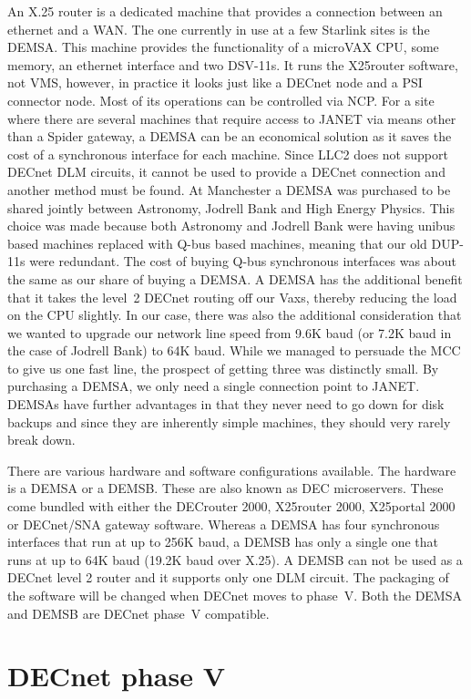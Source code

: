 An X.25 router is a dedicated machine that provides a connection between an
ethernet and a WAN. The one currently in use at a few Starlink sites is the
DEMSA. This machine provides the functionality of a microVAX CPU, some memory,
an ethernet interface and two DSV-11s. It runs the X25router software, not VMS,
however, in practice it looks just like a DECnet node and a PSI connector node.
Most of its operations can be controlled via NCP. For a site where there are
several machines that require access to JANET via means other than a Spider
gateway, a DEMSA can be an economical solution as it saves the cost of a
synchronous interface for each machine. Since LLC2 does not support DECnet DLM
circuits, it cannot be used to provide a DECnet connection and another  method
must be found. At Manchester a DEMSA was purchased to be shared jointly between
Astronomy, Jodrell Bank and High Energy Physics. This choice was made because
both Astronomy and Jodrell Bank were having unibus based machines replaced with
Q-bus based machines, meaning that our old DUP-11s were redundant. The cost of
buying Q-bus synchronous interfaces was about the same as our share of buying a
DEMSA. A DEMSA has the additional benefit that it takes the level~2  DECnet
routing off our Vaxs, thereby reducing the load on the CPU slightly. In our
case, there was also the additional consideration that we wanted to upgrade our
network line speed from 9.6K baud (or 7.2K baud in the case of Jodrell Bank) to
64K baud. While we managed to persuade the MCC to give us one fast line, the
prospect of getting three was distinctly small. By purchasing a DEMSA, we only
need a single connection point to JANET. DEMSAs have further advantages in that
they never need to go down for disk backups and since they are inherently
simple machines, they should very rarely break down.

There are various hardware and software configurations available. The hardware
is a DEMSA or a DEMSB. These are also known as DEC microservers. These come
bundled with either the DECrouter 2000, X25router 2000, X25portal 2000 or
DECnet/SNA gateway software. Whereas a DEMSA has four synchronous interfaces
that run at up to 256K baud, a DEMSB has only a single one that runs at up to
64K baud (19.2K baud over X.25). A DEMSB can not be used as a DECnet level 2
router and it supports only one DLM circuit. The packaging of the software
will be changed when DECnet moves to phase~V. Both the DEMSA and DEMSB are
DECnet phase~V compatible.

\section{DECnet phase V}

